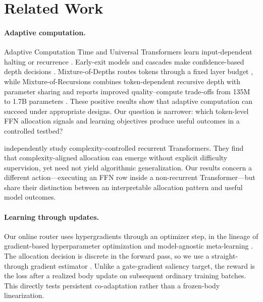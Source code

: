 \documentclass{article}
\begin{document}
\section{Related Work}
\paragraph{Adaptive computation.}
Adaptive Computation Time and Universal Transformers learn input-dependent
halting or recurrence \citep{graves2016act,dehghani2019universal}. Early-exit
models and cascades make confidence-based depth decisions
\citep{teerapittayanon2016branchynet,xin2020deebert,elbayad2020depth,schuster2022calm}.
Mixture-of-Depths routes tokens through a fixed layer budget
\citep{raposo2024mixture}, while Mixture-of-Recursions combines token-dependent
recursive depth with parameter sharing and reports improved quality--compute
trade-offs from 135M to 1.7B parameters \citep{bae2025mixture}. These positive
results show that adaptive computation can succeed under appropriate designs.
Our question is narrower: which token-level FFN allocation signals and learning
objectives produce useful outcomes in a controlled testbed?

\citet{moosa2026dynamic} independently study complexity-controlled recurrent
Transformers. They find that complexity-aligned allocation can emerge without
explicit difficulty supervision, yet need not yield algorithmic
generalization. Our results concern a different action---executing an FFN row
inside a non-recurrent Transformer---but share their distinction between an
interpretable allocation pattern and useful model outcomes.

\paragraph{Learning through updates.}
Our online router uses hypergradients through an optimizer step, in the lineage
of gradient-based hyperparameter optimization and model-agnostic meta-learning
\citep{maclaurin2015gradient,finn2017maml}. The allocation decision is discrete
in the forward pass, so we use a straight-through gradient estimator
\citep{bengio2013estimating}. Unlike a gate-gradient saliency target, the
reward is the loss after a realized body update on subsequent ordinary training
batches. This directly tests persistent co-adaptation rather than a frozen-body
linearization.
\end{document}
